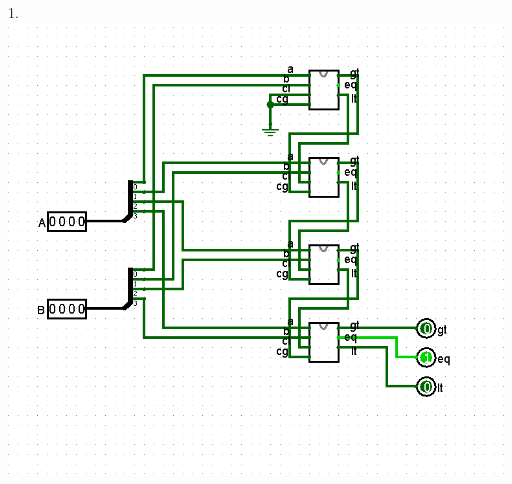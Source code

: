 \documentclass[a4paper, 20pt]{article}
\begin{document}
\begin{question}{1.}
\\
 \includegraphics[height=12cm]{4c.png} \\
\newpage
\end{question}
\end{document}
